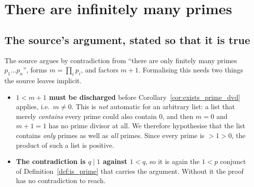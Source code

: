 \chapter{There are infinitely many primes}
\label{ch:infinitude}

\section{The source's argument, stated so that it is true}

The source argues by contradiction from ``there are only finitely many primes
$p_1 \dots p_n$'', forms $m = \prod_i p_i$, and factors $m + 1$. Formalising
this needs two things the source leaves implicit.

\begin{itemize}
  \item \textbf{$1 < m + 1$ must be discharged} before
    Corollary~\ref{cor:exists_prime_dvd} applies, i.e.\ $m \neq 0$. This is
    \emph{not} automatic for an arbitrary list: a list that merely
    \emph{contains} every prime could also contain $0$, and then $m = 0$ and
    $m + 1 = 1$ has no prime divisor at all. We therefore hypothesise that the
    list contains \emph{only} primes as well as \emph{all} primes. Since every
    prime is $> 1 > 0$, the product of such a list is positive.
  \item \textbf{The contradiction is $q \mid 1$ against $1 < q$}, so it is again
    the $1 < p$ conjunct of Definition~\ref{def:is_prime} that carries the
    argument. Without it the proof has no contradiction to reach.
\end{itemize}

